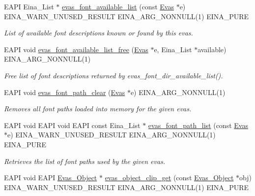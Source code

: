\begin{DoxyCompactItemize}
EAPI Eina\_\-List $\ast$ \hyperlink{group__Evas__Font__Group_ga9d51a2efecf89a81a2990db252f3dc6c}{evas\_\-font\_\-available\_\-list} (const \hyperlink{group__Evas__Canvas_ga5ff87cc4ce6bc43e3b640a6d37f73043}{Evas} $\ast$e) EINA\_\-WARN\_\-UNUSED\_\-RESULT EINA\_\-ARG\_\-NONNULL(1) EINA\_\-PURE
\begin{DoxyCompactList}\small\item\em List of available font descriptions known or found by this evas. \item\end{DoxyCompactList}\item 
EAPI void \hyperlink{group__Evas__Font__Group_gadde47be1a7d61f416bfa365a5a1e1467}{evas\_\-font\_\-available\_\-list\_\-free} (\hyperlink{group__Evas__Canvas_ga5ff87cc4ce6bc43e3b640a6d37f73043}{Evas} $\ast$e, Eina\_\-List $\ast$available) EINA\_\-ARG\_\-NONNULL(1)
\begin{DoxyCompactList}\small\item\em Free list of font descriptions returned by evas\_\-font\_\-dir\_\-available\_\-list(). \item\end{DoxyCompactList}\item 
EAPI void \hyperlink{group__Evas__Font__Path__Group_gad565539bda0fc124e4a0865fa29a8463}{evas\_\-font\_\-path\_\-clear} (\hyperlink{group__Evas__Canvas_ga5ff87cc4ce6bc43e3b640a6d37f73043}{Evas} $\ast$e) EINA\_\-ARG\_\-NONNULL(1)
\begin{DoxyCompactList}\small\item\em Removes all font paths loaded into memory for the given evas. \item\end{DoxyCompactList}\item 
EAPI void EAPI void EAPI const Eina\_\-List $\ast$ \hyperlink{group__Evas__Font__Path__Group_ga06fc80b3e4c27237a571404fc6aa3aeb}{evas\_\-font\_\-path\_\-list} (const \hyperlink{group__Evas__Canvas_ga5ff87cc4ce6bc43e3b640a6d37f73043}{Evas} $\ast$e) EINA\_\-WARN\_\-UNUSED\_\-RESULT EINA\_\-ARG\_\-NONNULL(1) EINA\_\-PURE
\begin{DoxyCompactList}\small\item\em Retrieves the list of font paths used by the given evas. \item\end{DoxyCompactList}\item 
EAPI void EAPI \hyperlink{group__Evas__Object__Group_ga9e19e6dd1f517a0ba437c0114d3e7c97}{Evas\_\-Object} $\ast$ \hyperlink{group__Evas__Object__Group__Basic_gadd9e5c165ff2129dd902f43c669a0c1a}{evas\_\-object\_\-clip\_\-get} (const \hyperlink{group__Evas__Object__Group_ga9e19e6dd1f517a0ba437c0114d3e7c97}{Evas\_\-Object} $\ast$obj) EINA\_\-WARN\_\-UNUSED\_\-RESULT EINA\_\-ARG\_\-NONNULL(1) EINA\_\-PURE

\end{DoxyCompactItemize}
